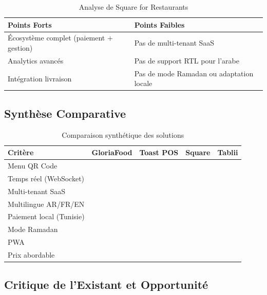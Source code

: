 \documentclass[12pt,a4paper]{report}
\newcommand{\checkmarkitem}{\ding{51}}
\newcommand{\crossitem}{\ding{55}}
\newcommand{\cmark}{\textcolor{accent}{\checkmarkitem}}
\newcommand{\xmark}{\textcolor{primary}{\crossitem}}
\begin{document}
\begin{table}[H]
    \centering
    \begin{tabularx}{\textwidth}{l X}
        \toprule
        \rowcolor{accent!10}
        \textbf{Points Forts} & \textbf{Points Faibles} \\
        \midrule
        Écosystème complet (paiement + gestion) & Pas de multi-tenant SaaS \\
        Analytics avancés & Pas de support RTL pour l'arabe \\
        Intégration livraison & Pas de mode Ramadan ou adaptation locale \\
        \bottomrule
    \end{tabularx}
    \caption{Analyse de Square for Restaurants}
    \label{tab:square}
\end{table}

\subsection{Synthèse Comparative}

\begin{table}[H]
    \centering
    \begin{tabularx}{\textwidth}{l c c c c}
        \toprule
        \rowcolor{primary!10}
        \textbf{Critère} & \textbf{GloriaFood} & \textbf{Toast POS} & \textbf{Square} & \textbf{Tablii} \\
        \midrule
        Menu QR Code & \cmark & \cmark & \cmark & \cmark \\
        Temps réel (WebSocket) & \xmark & \cmark & \cmark & \cmark \\
        Multi-tenant SaaS & \cmark & \xmark & \xmark & \cmark \\
        Multilingue AR/FR/EN & \xmark & \xmark & \xmark & \cmark \\
        Paiement local (Tunisie) & \xmark & \xmark & \xmark & \cmark \\
        Mode Ramadan & \xmark & \xmark & \xmark & \cmark \\
        PWA & \xmark & \xmark & \xmark & \cmark \\
        Prix abordable & \cmark & \xmark & \xmark & \cmark \\
        \bottomrule
    \end{tabularx}
    \caption{Comparaison synthétique des solutions}
    \label{tab:comparison}
\end{table}

\subsection{Critique de l'Existant et Opportunité}
\end{document}
